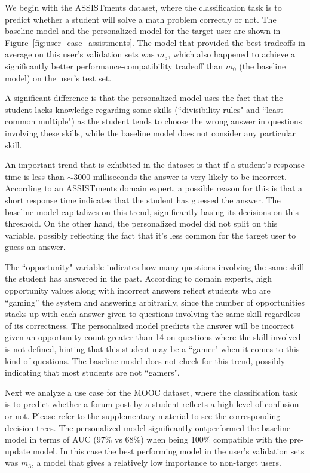 \documentclass[letterpaper]{article} %
\theoremstyle{definition}
\begin{document}
We begin with the ASSISTments dataset, where the classification task is to predict whether a student will solve a math problem correctly or not.  The baseline model and the personalized model for the target user are shown in Figure~\ref{fig:user_case_assistments}.
The model that provided the best tradeoffs in average on this user's validation sets was $m_5$, which also happened to achieve a significantly better performance-compatibility tradeoff than $m_0$ (the baseline model) on the user's test set.


A significant difference is that the personalized model uses the fact that the student lacks knowledge regarding some skills (``divisibility rules" and ``least common multiple") as the student tends to choose the wrong answer in questions involving these skills, while the baseline model does not consider any particular skill.

An important  trend that is  exhibited in  the dataset is that if a student's response time is less than $\sim$3000 milliseconds the answer is very likely to be incorrect.
According to an ASSISTments domain expert, a possible reason for this is that a short response time indicates that the student has guessed the answer.
The baseline model capitalizes on this trend, significantly basing its decisions on this threshold.
On the other hand, the personalized model did not split on this variable, possibly reflecting the fact that it's less common for the target user to guess an answer.

The ``opportunity" variable indicates how many questions involving the same skill the student has answered in the past.
According to domain experts, high opportunity values along with incorrect answers reflect students who are ``gaming'' the system and answering arbitrarily, since the number of opportunities stacks up with each answer given to questions involving the same skill regardless of its correctness.
The personalized model predicts the answer will be incorrect given an opportunity count greater than 14 on questions where the skill involved is not defined, hinting that this student may be a ``gamer" when it comes to this kind of questions. The baseline model does not check for this trend, possibly indicating that most students are not ``gamers".






Next we analyze a use case for the MOOC dataset, where the classification task is to predict whether a forum post by a student reflects a high level of confusion or not. Please refer to the supplementary material to see the corresponding decision trees. The personalized model significantly outperformed the baseline model in terms of AUC (97\% vs 68\%) when being 100\% compatible with the pre-update model. In this case the best performing model in the user's validation sets was $m_3$, a model that gives a relatively low importance to non-target users.
\end{document}
